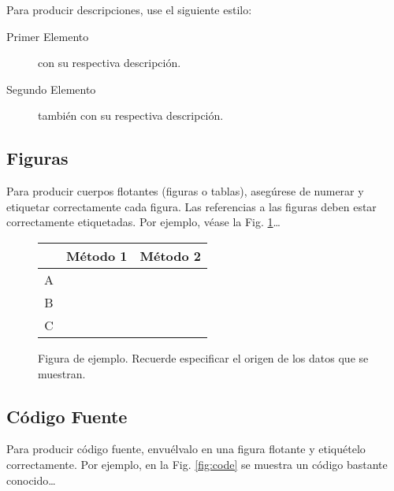 \documentclass[a4paper,10pt,twocolumn]{article}
\begin{document}
		Para producir descripciones, use el siguiente estilo:

		\begin{description}
			\item [Primer Elemento] con su respectiva descripción.
			\item [Segundo Elemento] también con su respectiva descripción.
		\end{description}

	\subsection{Figuras}\label{sub:figures}
		Para producir cuerpos flotantes (figuras o tablas), asegúrese de numerar
		y etiquetar correctamente cada figura. Las referencias a las figuras deben
		estar correctamente etiquetadas. Por ejemplo, véase la Fig. \ref{fig:ex}\ldots

		\begin{figure}[h!]%
		\begin{center}
			\begin{tabular}{|c|c|c|} \hline
			 			& Método 1 	& Método 2 	\\ \hline
			A 			&  			&  			\\ \hline
			B			& 			& 			\\ \hline
			C 			& 			&  			\\ \hline
			\end{tabular}
		\caption{Figura de ejemplo. Recuerde especificar el origen de los datos que se muestran. \label{fig:ex}}
		\end{center}
		\end{figure}

	\subsection{Código Fuente}\label{sub:listings}
		Para producir código fuente, envuélvalo en una figura flotante y
		etiquételo correctamente. Por ejemplo, en la Fig. \ref{fig:code}
		se muestra un código bastante conocido\ldots
\end{document}
